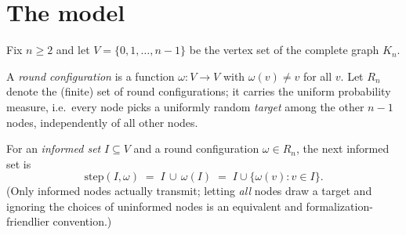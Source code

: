 
\begin{abstract}
\noindent
We give a complete and elementary proof that the uniform \emph{push} protocol
on the complete graph $K_n$, started from a single informed node, informs all
$n$ nodes within $O(\log n)$ rounds with high probability. The probability
space is finite and uniform throughout; the only analytic ingredients are
Bernoulli's inequality and Markov's inequality, and the only concentration
tool is a one-line exponential-moment induction for adaptive Bernoulli
trials. No measure theory, no PMF/\texttt{ENNReal}, no Chernoff bounds, and
no martingales are used. This argument has been \emph{fully formalized} (no
\texttt{sorry}) in Lean~4 + Mathlib; the main theorem is
\texttt{RumorPush.push\_informs\_all\_whp}.
With the same random calls, the \emph{pull} and \emph{push--pull} protocols
of Karp, Schindelhauer, Shenker and V\"ocking also inform all nodes within
$O(\log n)$ rounds with high probability (Section~\ref{sec:pull}); for pull,
a second-moment bound replaces the reverse Markov inequality.
\end{abstract}

\section{The model}\label{sec:model}

Fix $n \ge 2$ and let $V = \{0,1,\dots,n-1\}$ be the vertex set of the
complete graph $K_n$.

\begin{definition}\label{def:round}
  \leanok
  A \emph{round configuration} is a function
  $\omega \colon V \to V$ with $\omega(v) \ne v$ for all $v$.
  Let $R_n$ denote the (finite) set of round configurations; it carries the
  uniform probability measure, i.e.\ every node picks a uniformly random
  \emph{target} among the other $n-1$ nodes, independently of all other
  nodes.
\end{definition}

\begin{definition}\label{def:step}
  \leanok
  For an \emph{informed set} $I \subseteq V$ and a round configuration
  $\omega \in R_n$, the next informed set is
  \[
    \mathrm{step}(I,\omega) \;=\; I \,\cup\, \omega(I)
    \;=\; I \cup \{\omega(v) : v \in I\}.
  \]
  (Only informed nodes actually transmit; letting \emph{all} nodes draw a
  target and ignoring the choices of uninformed nodes is an equivalent and
  formalization-friendlier convention.)
\end{definition}

